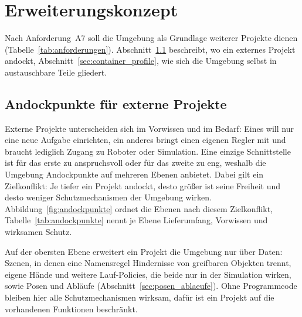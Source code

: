 \section{Erweiterungskonzept}
\label{sec:erweiterungskonzept}
Nach Anforderung~A7 soll die Umgebung als Grundlage weiterer Projekte dienen (Tabelle~\ref{tab:anforderungen}).
Abschnitt~\ref{sec:andockpunkte} beschreibt, wo ein externes Projekt andockt, Abschnitt~\ref{sec:container_profile},
wie sich die Umgebung selbst in austauschbare Teile gliedert.

\subsection{Andockpunkte für externe Projekte}
\label{sec:andockpunkte}
Externe Projekte unterscheiden sich im Vorwissen und im Bedarf: Eines will nur eine neue Aufgabe einrichten, ein
anderes bringt einen eigenen Regler mit und braucht lediglich Zugang zu Roboter oder Simulation.
Eine einzige Schnittstelle ist für das erste zu anspruchsvoll oder für das zweite zu eng, weshalb die Umgebung
Andockpunkte auf mehreren Ebenen anbietet.
Dabei gilt ein Zielkonflikt: Je tiefer ein Projekt andockt, desto größer ist seine Freiheit und desto weniger
Schutzmechanismen der Umgebung wirken.
Abbildung~\ref{fig:andockpunkte} ordnet die Ebenen nach diesem Zielkonflikt, Tabelle~\ref{tab:andockpunkte} nennt je
Ebene Lieferumfang, Vorwissen und wirksamen Schutz.

Auf der obersten Ebene erweitert ein Projekt die Umgebung nur über Daten: Szenen, in denen eine Namensregel
Hindernisse von greifbaren Objekten trennt, eigene Hände und weitere Lauf-Policies, die beide nur in der Simulation
wirken, sowie Posen und Abläufe (Abschnitt~\ref{sec:posen_ablaeufe}).
Ohne Programmcode bleiben hier alle Schutzmechanismen wirksam, dafür ist ein Projekt auf die vorhandenen Funktionen
beschränkt.

